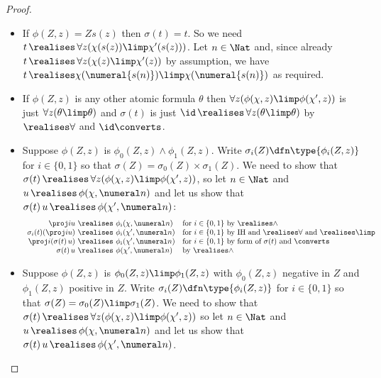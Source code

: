 \begin{proof}
    
    \begin{itemize}
        \item If $\phi(Z,z)=Zs(z)$ then $\sigma(t) = t $. So we need $t\, \realises\, \forall z(\chi(s(z)) \limp \chi'(s(z))) $. Let $n\in \Nat$ and, since already $t\, \realises\, \forall z (\chi(z) \limp \chi'(z))$ by assumption, we have $t\, \realises \chi(\numeral{s(n)}) \limp \chi(\numeral {s(n)})$ as required.
        \item If $\phi(Z,z)$ is any other atomic formula $\theta$ then $\forall z (\phi(\chi,z)\limp \phi(\chi',z))$ is just $\forall z (\theta \limp \theta)$ and $\sigma(t)$ is just $\id\, \realises \, \forall z (\theta \limp \theta)$ by $\realises\forall$ and $\id\converts$.
        \item Suppose $\phi(Z,z)$ is $\phi_0(Z,z) \land \phi_1(Z,z)$. 
        Write $\sigma_i(Z) \dfn \type {\phi_i(Z,z)}$ for $i\in \{0,1\}$ so that $\sigma(Z) = \sigma_0(Z) \times \sigma_1(Z)$.
        We need to show that $\sigma(t)\, \realises\, \forall z (\phi(\chi,z) \limp \phi(\chi',z))$, so let $n\in \Nat$ and $u\, \realises\, \phi(\chi,\numeral n)$ and let us show that $\sigma(t)\, u \, \realises \, \phi(\chi',\numeral n)$:
        \[
        \begin{array}{r@{\ \realises\ }ll}
             \proj i u & \phi_i(\chi,\numeral n) & \text{for $i\in \{0,1\}$ by $\realises\land$} \\
             \sigma_i(t) (\proj i u) & \phi_i(\chi', \numeral n) & \text{for $i\in \{0,1\}$ by IH and $\realises\forall$ and $\realises\limp$} \\
             \proj i (\sigma(t)\, u) & \phi_i(\chi',\numeral n) &\text{for $i\in \{0,1\}$ by form of $\sigma(t)$ and $\converts$} \\
             \sigma(t)\, u  & \phi(\chi',\numeral n) & \text{by $\realises\land$}
        \end{array}
        \]
        \item Suppose $\phi(Z,z)$ is $\phi_0(Z,z) \limp \phi_1(Z,z)$ with $\phi_0(Z,z)$ negative in $Z$ and $\phi_1(Z,z)$ positive in $Z$. 
        Write $\sigma_i(Z)\dfn \type{\phi_i(Z,z)}$ for $i\in \{0,1\}$ so that $\sigma(Z) = \sigma_0(Z) \limp \sigma_1(Z)$.
        We need to show that $\sigma(t)\, \realises\, \forall z (\phi(\chi,z) \limp \phi(\chi',z))$ so let $n\in \Nat $ and $u\, \realises\, \phi(\chi,\numeral n)$ and let us show that $\sigma(t)\, u \, \realises\, \phi(\chi',\numeral n)$.

\end{itemize}
\end{proof}
